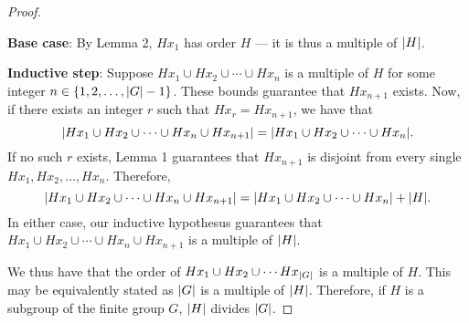 \documentclass[11pt]{article}
\begin{document}
\begin{proof}
\begin{adjustwidth}{1cm}{}
		\textbf{Base case}: By Lemma 2, $Hx_{1}$ has order $H$ --- it is thus a multiple of $\abs{H}$.

		\textbf{Inductive step}: Suppose $Hx_{1} \cup Hx_{2} \cup \cdots \cup Hx_{n}$ is a multiple of $H$ for some integer $n \in \{ 1, 2, \ldots, \abs{G} - 1 \}$. These bounds guarantee that $Hx_{n + 1}$ exists. Now, if there exists an integer $r$ such that $Hx_{r} = Hx_{n + 1}$, we have that
		\[
			\abs{Hx_{1} \cup Hx_{2} \cup \cdots \cup Hx_{n} \cup Hx_{n + 1}} = \abs{Hx_{1} \cup Hx_{2} \cup \cdots \cup Hx_{n}}.
		\]
		If no such $r$ exists, Lemma 1 guarantees that $Hx_{n + 1}$ is disjoint from every single $Hx_{1}, Hx_{2}, \ldots, Hx_{n}$. Therefore,
		\[
			\abs{Hx_{1} \cup Hx_{2} \cup \cdots \cup Hx_{n} \cup Hx_{n + 1}} = \abs{Hx_{1} \cup Hx_{2} \cup \cdots \cup Hx_{n}} + \abs{H}.
		\]
		In either case, our inductive hypothesus guarantees that $Hx_{1} \cup Hx_{2} \cup \cdots \cup Hx_{n} \cup Hx_{n + 1}$ is a multiple of $\abs{H}$.

	\end{adjustwidth}
 	We thus have that the order of $Hx_{1} \cup Hx_{2} \cup \cdots Hx_{\abs{G}}$ is a multiple of $H$. This may be equivalently stated as $\abs{G}$ is a multiple of $\abs{H}$. Therefore, if $H$ is a subgroup of the finite group $G$, $\abs{H}$ divides $\abs{G}$.
\end{proof}

\end{document}

